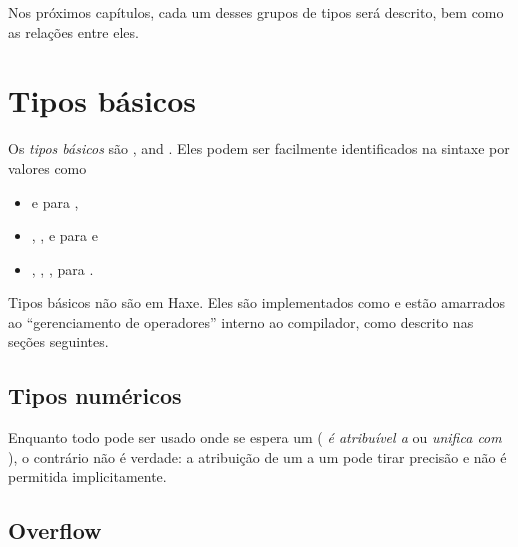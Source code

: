 Nos próximos capítulos, cada um desses grupos de tipos será descrito, bem como as relações entre eles.


\section{Tipos básicos}
\label{types-basic-types}

Os \emph{tipos básicos} são ,  and . Eles podem ser facilmente identificados na sintaxe por valores como


\begin{itemize}
	\item {} e  para ,
	\item {}, ,  e  para  e
	\item {}, , ,  para .
\end{itemize}

Tipos básicos não são  em Haxe. Eles são implementados como  e estão amarrados ao ``gerenciamento de operadores'' interno ao compilador, como descrito nas seções seguintes.

\subsection{Tipos numéricos}
\label{types-numeric-types}


Enquanto todo  pode ser usado onde se espera um  ( \emph{é atribuível a} ou \emph{unifica com} ), o contrário não é verdade: a atribuição de um  a um  pode tirar precisão e não é permitida implicitamente.

\subsection{Overflow}
\label{types-overflow}

